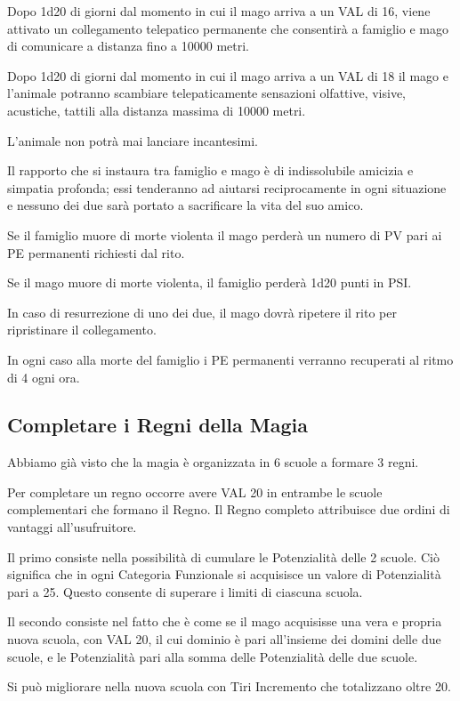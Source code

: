Dopo 1d20 di
giorni dal momento in cui il mago arriva a un VAL di 16, viene
attivato un collegamento telepatico permanente che consentir\`a a
famiglio e mago di comunicare a distanza fino a 10000 metri. 

Dopo 1d20
di giorni dal momento in cui il mago arriva a un VAL di 18 il mago e
l'animale potranno scambiare telepaticamente sensazioni olfattive,
visive, acustiche, tattili alla distanza massima di 10000 metri.

L'animale non potr\`a mai lanciare incantesimi. 

Il rapporto che si
instaura tra famiglio e mago \`e di indissolubile amicizia e
simpatia profonda; essi tenderanno ad aiutarsi reciprocamente in ogni
situazione e nessuno dei due sar\`a portato a sacrificare la vita
del suo amico. 

Se il famiglio muore di morte violenta il mago
perder\`a un numero di PV pari ai PE permanenti richiesti dal rito.

Se il mago muore di morte violenta, il famiglio perder\`a 1d20 punti
in PSI.

In caso di resurrezione di uno dei due, il mago dovr\`a
ripetere il rito per ripristinare il collegamento. 

In ogni caso alla morte del famiglio i PE permanenti verranno
recuperati al ritmo di 4 ogni ora.

\subsection{Completare i Regni della Magia}

Abbiamo gi\`a visto che la magia \`e organizzata in 6 scuole
a formare 3 regni. 

Per completare un regno occorre avere VAL 20 in
entrambe le scuole complementari che formano il Regno. Il Regno
completo attribuisce due ordini di vantaggi all'usufruitore.  

Il primo consiste nella possibilit\`a di cumulare le Potenzialit\`a
delle 2 scuole.  Ci\`o significa che in ogni Categoria Funzionale si
acquisisce un valore di Potenzialit\`a pari a 25. Questo consente di
superare i limiti di ciascuna scuola.

Il secondo consiste nel fatto che \`e come se il mago acquisisse una
vera e propria nuova scuola, con VAL 20, il cui dominio \`e pari
all'insieme dei domini delle due scuole, e le Potenzialit\`a pari
alla somma delle Potenzialit\`a delle due scuole. 

Si pu\`o migliorare nella nuova scuola con Tiri Incremento che
totalizzano oltre 20.
\fi

